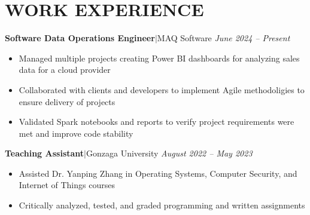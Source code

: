 \documentclass[11pt, a4paper, roman]{moderncv}
\newcommand{\entry}[4]{
	\textbf{#2}\:$|$\:#1 
	\hfill\textit{#3}
	#4
	\vspace{2mm}
}
\begin{document}
\vspace*{-2mm}
\section{WORK EXPERIENCE}

\entry{MAQ Software}{Software Data Operations Engineer}{June 2024 -- Present}
{\begin{itemize}
	\item Managed multiple projects creating Power BI dashboards for analyzing sales data for a cloud provider
	\item Collaborated with clients and developers to implement Agile methodoligies to ensure delivery of projects
	\item Validated Spark notebooks and reports to verify project requirements were met and improve code stability
\end{itemize}
}

\entry{Gonzaga University}{Teaching Assistant}{August 2022 -- May 2023}
{\begin{itemize}
	\item Assisted Dr. Yanping Zhang in Operating Systems, Computer Security, and Internet of Things courses
	\item Critically analyzed, tested, and graded programming and written assignments
\end{itemize}
}


\end{document}
